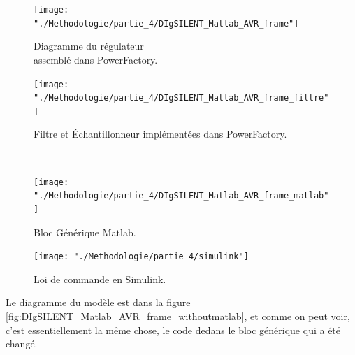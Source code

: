\begin{minipage}{\textwidth}
	\centering
\begin{minipage}{.475\textwidth}
	\begin{figure}[H]
		\captionsetup{justification=centering,margin=0cm}
		\begin{center}	
			\texttt{[image: "./Methodologie/partie\_4/DIgSILENT\_Matlab\_AVR\_frame"]}
			\caption{Diagramme du régulateur \\assemblé dans PowerFactory.}
			\label{fig:DIgSILENT_Matlab_AVR_frame}
		\end{center}
	\end{figure}
\end{minipage}
\begin{minipage}{.475\textwidth}
	\begin{figure}[H]
		\captionsetup{justification=centering,margin=0cm}
		\begin{center}	
			\texttt{[image: "./Methodologie/partie\_4/DIgSILENT\_Matlab\_AVR\_frame\_filtre"]}
			\caption{Filtre et Échantillonneur implémentées dans PowerFactory.}
			\label{fig:DIgSILENT_Matlab_AVR_frame_filtre}
		\end{center}
	\end{figure}
\end{minipage}\\
\begin{minipage}{.475\textwidth}
\begin{figure}[H]
	\captionsetup{justification=centering,margin=0cm}
	\begin{center}	
		\texttt{[image: "./Methodologie/partie\_4/DIgSILENT\_Matlab\_AVR\_frame\_matlab"]}
		\caption{Bloc Générique Matlab.}
		\label{fig:DIgSILENT_Matlab_AVR_frame_matlab}
	\end{center}
\end{figure}
\end{minipage}
\begin{minipage}{.475\textwidth}
\begin{figure}[H]
	\captionsetup{justification=centering,margin=0cm}
	\begin{center}	
		\texttt{[image: "./Methodologie/partie\_4/simulink"]}
		\caption{Loi de commande en Simulink.}
		\label{fig:simulink}
	\end{center}
\end{figure}
\end{minipage}
\end{minipage}

Le diagramme du modèle est dans la figure \ref{fig:DIgSILENT_Matlab_AVR_frame_withoutmatlab}, et comme on peut voir, c'est  essentiellement la même chose, le code dedans le bloc générique qui a été changé. 

